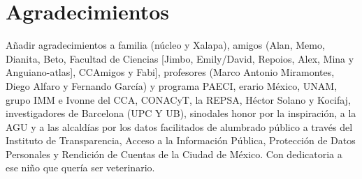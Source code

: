 \chapter{Agradecimientos}


Añadir agradecimientos a familia (núcleo y Xalapa), amigos (Alan, Memo, Dianita, Beto, Facultad de Ciencias [Jimbo, Emily/David, Repoios, Alex, Mina y Anguiano-atlas], CCAmigos y Fabi], profesores (Marco Antonio Miramontes, Diego Alfaro y Fernando García) y programa PAECI, erario México, UNAM, grupo IMM e Ivonne del CCA, CONACyT, la REPSA, Héctor Solano y Kocifaj, investigadores de Barcelona (UPC Y UB), sinodales honor por la inspiración,  a la AGU y a las alcaldías por los datos facilitados de alumbrado público a través del Instituto de Transparencia, Acceso a la Información Pública, Protección de Datos Personales y Rendición de Cuentas de la Ciudad de México. Con dedicatoria a ese niño que quería ser veterinario.







